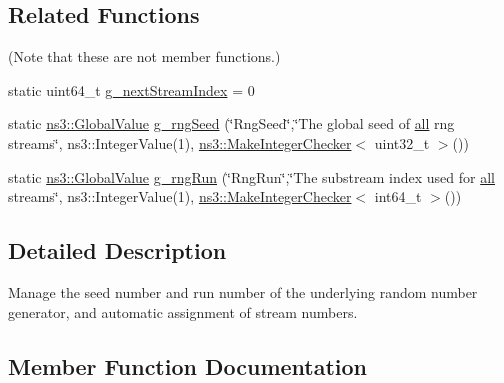 \subsection*{Related Functions}
(Note that these are not member functions.) \begin{DoxyCompactItemize}
\item 
static uint64\+\_\+t \hyperlink{classns3_1_1RngSeedManager_ae2b9d32369166b9ea617d2d9705db513}{g\+\_\+next\+Stream\+Index} = 0
\item 
static \hyperlink{classns3_1_1GlobalValue}{ns3\+::\+Global\+Value} \hyperlink{classns3_1_1RngSeedManager_ae865165116e0452b813b18bbd03eaf98}{g\+\_\+rng\+Seed} (\char`\"{}Rng\+Seed\char`\"{},\char`\"{}The global seed of \hyperlink{mmwave_2model_2fading-traces_2fading__trace__generator_8m_a00a349297fa58bc80ff5329e25dcfe28}{all} rng streams\char`\"{}, ns3\+::\+Integer\+Value(1), \hyperlink{namespacens3_a8ecbab8d1cca8a427a4c122f43e164d2}{ns3\+::\+Make\+Integer\+Checker}$<$ uint32\+\_\+t $>$())
\item 
static \hyperlink{classns3_1_1GlobalValue}{ns3\+::\+Global\+Value} \hyperlink{classns3_1_1RngSeedManager_afbf0a3626bab3583b076eec1c46ecd98}{g\+\_\+rng\+Run} (\char`\"{}Rng\+Run\char`\"{},\char`\"{}The substream index used for \hyperlink{mmwave_2model_2fading-traces_2fading__trace__generator_8m_a00a349297fa58bc80ff5329e25dcfe28}{all} streams\char`\"{}, ns3\+::\+Integer\+Value(1), \hyperlink{namespacens3_a8ecbab8d1cca8a427a4c122f43e164d2}{ns3\+::\+Make\+Integer\+Checker}$<$ int64\+\_\+t $>$())
\end{DoxyCompactItemize}


\subsection{Detailed Description}
Manage the seed number and run number of the underlying random number generator, and automatic assignment of stream numbers. 

\subsection{Member Function Documentation}
